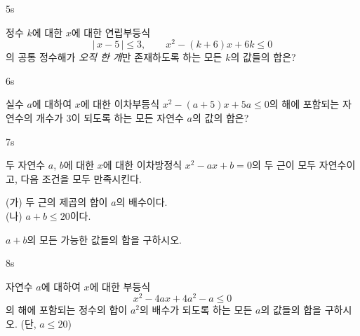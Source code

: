\documentclass[10pt]{article}
\begin{document}
\begin{pagepair}

\begin{problem}{5}{s}
\par\smallskip
정수 $k$에 대한 $x$에 대한 연립부등식
$$|\,x - 5\,| \le 3, \qquad x^2 - (k + 6)x + 6k \le 0$$
의 공통 정수해가 \emph{오직 한 개}만 존재하도록 하는 모든 $k$의 값들의 합은?
\begin{choices}
\end{choices}
\end{problem}

\begin{problem}{6}{s}
\par\smallskip
실수 $a$에 대하여 $x$에 대한 이차부등식 $x^2 - (a + 5)x + 5a \le 0$의 해에 포함되는 자연수의 개수가 $3$이 되도록 하는 모든 자연수 $a$의 값의 합은?
\begin{choices}
\end{choices}
\end{problem}

\end{pagepair}


\begin{pagepair}

\begin{problem}{7}{s}
\par\smallskip
두 자연수 $a$, $b$에 대한 $x$에 대한 이차방정식 $x^2 - ax + b = 0$의 두 근이 모두 자연수이고, 다음 조건을 모두 만족시킨다.
\begin{conditions}
(가) 두 근의 제곱의 합이 $a$의 배수이다. \\
(나) $a + b \le 20$이다.
\end{conditions}
$a + b$의 모든 가능한 값들의 합을 구하시오.
\end{problem}

\begin{problem}{8}{s}
\par\smallskip
자연수 $a$에 대하여 $x$에 대한 부등식
$$x^2 - 4ax + 4a^2 - a \le 0$$
의 해에 포함되는 정수의 합이 $a^2$의 배수가 되도록 하는 모든 $a$의 값들의 합을 구하시오. (단, $a \le 20$)
\end{problem}

\end{pagepair}
\end{document}
